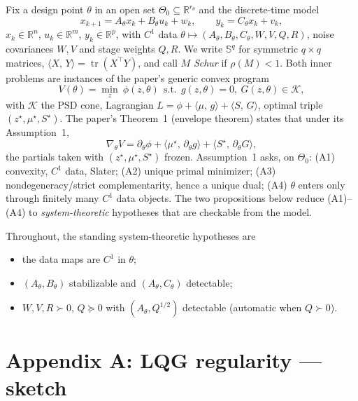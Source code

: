 \documentclass[11pt]{article}
\theoremstyle{definition}
\DeclareMathOperator{\tr}{tr}
\newcommand{\R}{\mathbb{R}}
\newcommand{\Sym}{\mathbb{S}}
\newcommand{\Th}{\theta}
\newcommand{\Nbhd}{\Theta_{0}}
\newcommand{\half}{{1/2}}
\newcommand{\inner}[2]{\langle #1,\, #2\rangle}
\begin{document}
Fix a design point $\Th$ in an open set $\Nbhd\subseteq\R^{r_\theta}$ and the
discrete-time model
\begin{equation}\label{eq:model}
x_{k+1}=A_\Th x_k+B_\Th u_k+w_k,\qquad y_k=C_\Th x_k+v_k,
\end{equation}
$x_k\in\R^{n}$, $u_k\in\R^{m}$, $y_k\in\R^{p}$, with $C^1$ data
$\Th\mapsto(A_\Th,B_\Th,C_\Th,W,V,Q,R)$, noise covariances $W,V$ and stage weights
$Q,R$. We write $\Sym^q$ for symmetric $q\times q$ matrices,
$\inner{X}{Y}=\tr(X^\top Y)$, and call $M$ \emph{Schur} if $\rho(M)<1$. Both inner
problems are instances of the paper's generic convex program
\begin{equation}\label{eq:generic}
V(\Th)=\min_{z}\ \phi(z,\Th)\ \ \text{s.t.}\ \ g(z,\Th)=0,\ G(z,\Th)\in\mathcal K,
\end{equation}
with $\mathcal K$ the PSD cone, Lagrangian $L=\phi+\inner{\mu}{g}+\inner{S}{G}$,
optimal triple $(z^\star,\mu^\star,S^\star)$. The paper's Theorem~1 (envelope
theorem) states that under its Assumption~1,
\begin{equation}\label{eq:envelope}
\nabla_\Th V=\partial_\Th\phi+\inner{\mu^\star}{\partial_\Th g}
+\inner{S^\star}{\partial_\Th G},
\end{equation}
the partials taken with $(z^\star,\mu^\star,S^\star)$ frozen. Assumption~1 asks,
on $\Nbhd$: (A1) convexity, $C^1$ data, Slater; (A2) unique primal minimizer;
(A3) nondegeneracy/strict complementarity, hence a unique dual; (A4) $\Th$ enters
only through finitely many $C^1$ data objects. The two propositions below reduce
(A1)--(A4) to \emph{system-theoretic} hypotheses that are checkable from the model.

Throughout, the standing system-theoretic hypotheses are
\begin{itemize}
\item[\textup{(S1)}] the data maps are $C^1$ in $\Th$;
\item[\textup{(S2)}] $(A_\Th,B_\Th)$ stabilizable and $(A_\Th,C_\Th)$ detectable;
\item[\textup{(S3)}] $W,V,R\succ0$, $Q\succeq0$ with $(A_\Th,Q^{\half})$ detectable
      (automatic when $Q\succ0$).
\end{itemize}

\section{Appendix A: LQG regularity --- sketch}\label{sec:lqg}
\end{document}
